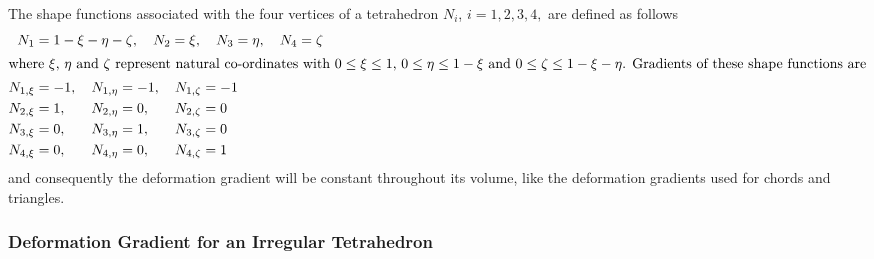The shape functions associated with the four vertices of a tetrahedron $N_i$, $i = 1, 2, 3, 4,$ are defined as follows
\begin{subequations}
    \begin{align}
    N_1 & = 1 - \xi - \eta - \zeta , \quad
    N_2 = \xi , \quad
    N_3 = \eta , \quad
    N_4 = \zeta \\
    \intertext{where $\xi$, $\eta$ and $\zeta$ represent natural co-ordinates with $0 \leq \xi \leq 1$, $0 \leq \eta \leq 1-\xi$ and $0 \leq \zeta \leq 1-\xi-\eta$.  Gradients of these shape functions are} 
    N_{1,\xi} & = -1 , \quad N_{1,\eta} = -1 , \quad N_{1,\zeta} = -1 \notag \\
    N_{2,\xi} & = 1 , \quad \phantom{-} N_{2,\eta} = 0 , \quad \phantom{-} N_{2,\zeta} = 0 \notag \\
    N_{3,\xi} & = 0 , \quad \phantom{-} N_{3,\eta} = 1 , \quad \phantom{-} N_{3,\zeta} = 0 \notag \\
    N_{4,\xi} & = 0 , \quad \phantom{-} N_{4,\eta} = 0 , \quad \phantom{-} N_{4,\zeta} = 1 
    \end{align}
\end{subequations}
and consequently the deformation gradient will be constant throughout its volume, like the deformation gradients used for chords and triangles.

\subsubsection{Deformation Gradient for an Irregular Tetrahedron}

